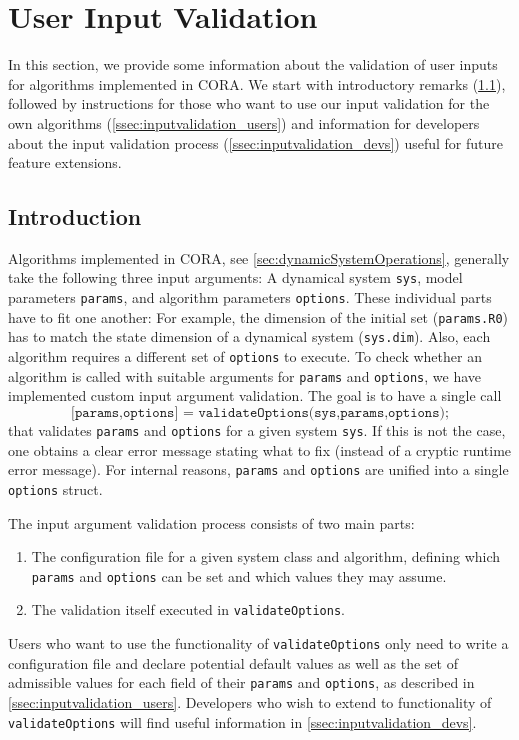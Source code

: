 \section{User Input Validation}
\label{sec:inputvalidation}

In this section, we provide some information about the validation of user inputs for algorithms implemented in CORA.
We start with introductory remarks (\cref{ssec:inputvalidation_introduction}), followed by instructions for those who want to use our input validation for the own algorithms (\cref{ssec:inputvalidation_users}) and information for developers about the input validation process (\cref{ssec:inputvalidation_devs}) useful for future feature extensions.


\subsection{Introduction}
\label{ssec:inputvalidation_introduction}

Algorithms implemented in CORA, see \cref{sec:dynamicSystemOperations}, generally take the following three input arguments:
A dynamical system \texttt{sys}, model parameters \texttt{params}, and algorithm parameters \texttt{options}.
These individual parts have to fit one another:
For example, the dimension of the initial set (\texttt{params.R0}) has to match the state dimension of a dynamical system (\texttt{sys.dim}).
Also, each algorithm requires a different set of \texttt{options} to execute.
To check whether an algorithm is called with suitable arguments for \texttt{params} and \texttt{options}, we have implemented custom input argument validation.
The goal is to have a single call
\begin{equation*}
	\texttt{[params,options] = validateOptions(sys,params,options);}
\end{equation*}
that validates \texttt{params} and \texttt{options} for a given system \texttt{sys}.
If this is not the case, one obtains a clear error message stating what to fix (instead of a cryptic runtime error message).
For internal reasons, \texttt{params} and \texttt{options} are unified into a single \texttt{options} struct.

The input argument validation process consists of two main parts:
\begin{enumerate}
	\item The configuration file for a given system class and algorithm, defining which \texttt{params} and \texttt{options} can be set and which values they may assume.
	\item The validation itself executed in \texttt{validateOptions}.
\end{enumerate}
Users who want to use the functionality of \texttt{validateOptions} only need to write a configuration file and declare potential default values as well as the set of admissible values for each field of their \texttt{params} and \texttt{options}, as described in \cref{ssec:inputvalidation_users}.
Developers who wish to extend to functionality of \texttt{validateOptions} will find useful information in \cref{ssec:inputvalidation_devs}.

